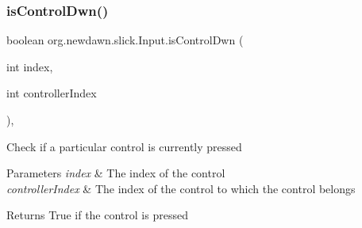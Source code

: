 \subsubsection{\texorpdfstring{is\+Control\+Dwn()}{isControlDwn()}}
{\footnotesize\ttfamily boolean org.\+newdawn.\+slick.\+Input.\+is\+Control\+Dwn (\begin{DoxyParamCaption}\item[{int}]{index,  }\item[{int}]{controller\+Index }\end{DoxyParamCaption})\hspace{0.3cm}{\ttfamily [inline]}, {\ttfamily [private]}}

Check if a particular control is currently pressed


\begin{DoxyParams}{Parameters}
{\em index} & The index of the control \\
\hline
{\em controller\+Index} & The index of the control to which the control belongs \\
\hline
\end{DoxyParams}
\begin{DoxyReturn}{Returns}
True if the control is pressed 
\end{DoxyReturn}

